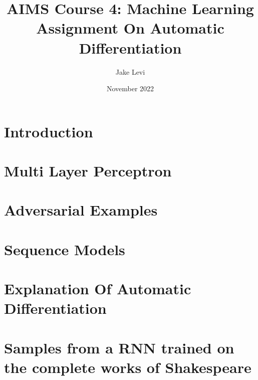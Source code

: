 \documentclass{article}
\title{
    AIMS Course 4: Machine Learning \\
    \large Assignment On Automatic Differentiation
}
\author{Jake Levi}
\date{November 2022}
\begin{document}
\maketitle
\section{Introduction} \label{section:intro}

\section{Multi Layer Perceptron}

\section{Adversarial Examples}

\section{Sequence Models}



\appendix
\section{Explanation Of Automatic Differentiation}\label{appendix:autodiff}
\section{Samples from a RNN trained on the complete works of Shakespeare}\label{appendix:rnn samples}


\end{document}
